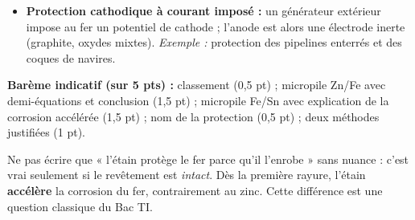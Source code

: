 \documentclass[11pt]{article}
\begin{document}
\begin{corrige}
\begin{enumerate}
\begin{itemize}
\item \textbf{Protection cathodique à courant imposé :} un générateur extérieur impose au fer un potentiel de cathode ; l'anode est alors une électrode inerte (graphite, oxydes mixtes). \emph{Exemple :} protection des pipelines enterrés et des coques de navires.
\end{itemize}
\end{enumerate}
\textbf{Barème indicatif (sur 5 pts) :} classement (0,5 pt) ; micropile Zn/Fe avec demi-équations et conclusion (1,5 pt) ; micropile Fe/Sn avec explication de la corrosion accélérée (1,5 pt) ; nom de la protection (0,5 pt) ; deux méthodes justifiées (1 pt).
\end{corrige}

\begin{attention}
Ne pas écrire que « l'étain protège le fer parce qu'il l'enrobe » sans nuance : c'est vrai seulement si le revêtement est \emph{intact}. Dès la première rayure, l'étain \textbf{accélère} la corrosion du fer, contrairement au zinc. Cette différence est une question classique du Bac TI.
\end{attention}
\end{document}
